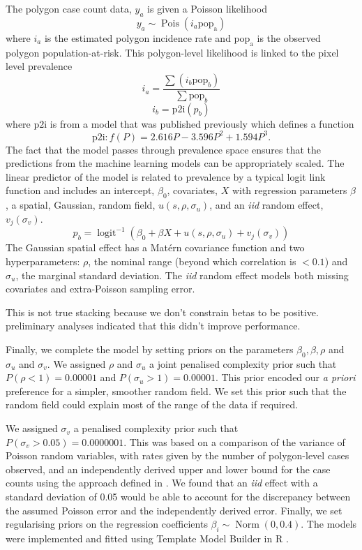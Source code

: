 \documentclass[11pt]{article}
\begin{document}
The polygon case count data, $y_a$ is given a Poisson likelihood
$$y_a \sim \operatorname{Pois}(i_a\mathrm{pop_a})$$
where $i_a$ is the estimated polygon incidence rate and $\mathrm{pop_a}$ is the observed polygon population-at-risk. 
This polygon-level likelihood is linked to the pixel level prevalence 
$$i_a = \frac{ \sum(i_b \mathrm{pop}_b)}{\sum  \mathrm{pop}_b} $$
$$i_b = \mathrm{p2i}(p_b)$$
where $\mathrm{p2i}$ is from a model that was published previously \citep{cameron2015defining} which defines a function
$$\mathrm{p2i}: f(P) = 2.616P - 3.596P^2 + 1.594P^3.$$
The fact that the model passes through prevalence space ensures that the predictions from the machine learning models can be appropriately scaled.
The linear predictor of the model is related to prevalence by a typical logit link function and includes an intercept, $\beta_0$, covariates, $X$ with regression parameters $\beta$, a spatial, Gaussian, random field, $u(s, \rho, \sigma_u)$, and an \emph{iid} random effect, $v_j(\sigma_v)$.
$$p_b = \operatorname{logit}^{-1}\left(\beta_0 + \beta X  + u(s, \rho, \sigma_u) + v_j(\sigma_v)\right)$$
The Gaussian spatial effect has a Mat\'ern covariance function and two hyperparameters: $\rho$, the nominal range (beyond which correlation is $< 0.1$) and $\sigma_u$, the marginal standard deviation.
The \emph{iid} random effect models both missing covariates and extra-Poisson sampling error.

This is not true stacking because we don't constrain betas to be positive.
preliminary analyses indicated that this didn't improve performance.

Finally, we complete the model by setting priors on the parameters $\beta_0, \beta, \rho$ and $\sigma_u$ and $\sigma_v$. 
We assigned $\rho$ and $\sigma_u$ a joint penalised complexity prior \citep{fuglstad2018constructing} such that $P(\rho < 1) = 0.00001$ and $P(\sigma_u > 1) = 0.00001$. 
This prior encoded our \emph{a priori} preference for a simpler, smoother random field.
We set this prior such that the random field could explain most of the range of the data if required.

We assigned $\sigma_v$ a penalised complexity prior \citep{simpson2017penalising} such that $P(\sigma_v > 0.05) = 0.0000001$. 
This was based on a comparison of the variance of Poisson random variables, with rates given by the number of polygon-level cases observed, and an independently derived upper and lower bound for the case counts using the approach defined in \citep{cibulskis2011worldwide}. 
We found that an \emph{iid} effect with a standard deviation of 0.05 would be able to account for the discrepancy between the assumed Poisson error and the independently derived error.
Finally, we set regularising priors on the regression coefficients $\beta_i \sim \operatorname{ Norm}(0, 0.4)$. 
The models were implemented and fitted using Template Model Builder \citep{TMB} in R \citep{R}.
\end{document}
